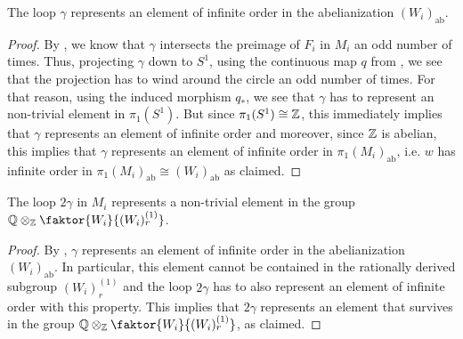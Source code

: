 \begin{lemma}\label{lem:infiniteorder}
    The loop \(\gamma\) represents an element of infinite order in the abelianization \((W_i)_{\text{ab}}\).
\end{lemma}
\begin{proof}
    By , we know that \(\gamma\) intersects the preimage of \(F_i\) in \(M_i\) an odd number of times.
    Thus, projecting \(\gamma\) down to \(S^1\), using the continuous map \(q\) from , we see that the projection has to wind around the circle an odd number of times.
    For that reason, using the induced morphism \(q_*\), we see that \(\gamma\) has to represent an non-trivial element in \(\pi_1(S^1)\).
    But since \(\pi_1(S^1) \cong \mathbb{Z}\), this immediately implies that \(\gamma\) represents an element of infinite order and moreover, since \(\mathbb{Z}\) is abelian, this implies that \(\gamma\) represents an element of infinite order in \(\pi_1(M_i)_{\text{ab}}\), i.e. \(w\) has infinite order in \(\pi_1(M_i)_{\text{ab}} \cong (W_i)_{\text{ab}}\) as claimed.
\end{proof}

\begin{corollary}\label{cor:looptwo}
    The loop \(2\gamma\) in \(M_i\) represents a non-trivial element in the group \(\Q \otimes_\Z \faktor{W_i}{(W_i)_r^{(1)}}\).
\end{corollary}
\begin{proof}
    By , \(\gamma\) represents an element of infinite order in the abelianization \((W_i)_{\text{ab}}\).
    In particular, this element cannot be contained in the rationally derived subgroup \((W_i)_r^{(1)}\) and the loop \(2\gamma\) has to also represent an element of infinite order with this property.
    This implies that \(2\gamma\) represents an element that survives in the group \(\Q \otimes_\Z \faktor{W_i}{(W_i)_r^{(1)}}\), as claimed.
\end{proof}


